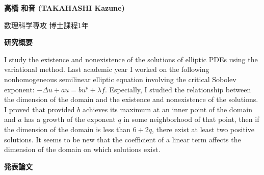 \documentclass[a4j,twocolumn]{jarticle}
\begin{document}



{\bf 高橋 和音 (TAKAHASHI Kazune)}




数理科学専攻 博士課程1年


\vspace{0.2cm}
\noindent
{\bf 研究概要}

\vspace{0.1cm}

I study the existence and nonexistence of the solutions
of elliptic PDEs using the variational method.
Last academic year I worked on the following
nonhomogeneous semilinear elliptic equation
involving the critical Sobolev exponent:
$-\Delta u + a u = b u^p + \lambda f$. Especially, I studied
the relationship between the dimension of the domain and
the existence and nonexistence of the solutions.
I proved that provided 
$b$ achieves its maximum at an inner point of the
domain and $a$ has a growth of the exponent $q$
in some neighborhood of that point, then
if the dimension of the domain is less than $6 + 2q$,
there exist at least two positive solutions.
It seems to be new that the coefficient of a linear term affects
the dimension of the domain on which solutions exist. 

\vspace{0.2cm}
\noindent
{\bf 発表論文}

\vspace{0.1cm}
\end{document}
